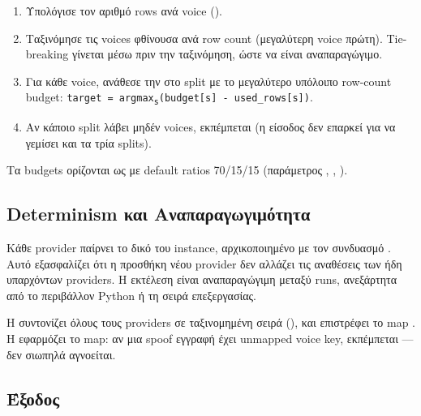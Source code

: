 \begin{english}
\begin{enumerate}
  \item Υπολόγισε τον αριθμό rows ανά voice
        ().
  \item Ταξινόμησε τις voices φθίνουσα ανά row count
        (μεγαλύτερη voice πρώτη).
        Tie-breaking γίνεται μέσω 
        πριν την ταξινόμηση, ώστε να είναι αναπαραγώγιμο.
  \item Για κάθε voice, ανάθεσε την στο split
        με το μεγαλύτερο υπόλοιπο row-count budget:
        \texttt{target = argmax\textsubscript{s}(budget[s] - used\_rows[s])}.
  \item Αν κάποιο split λάβει μηδέν voices,
        εκπέμπεται 
        (η είσοδος δεν επαρκεί για να γεμίσει και τα τρία splits).
\end{enumerate}
\end{english}

Τα budgets ορίζονται ως 
με default ratios 70/15/15 (παράμετρος ,
, ).

\subsection{Determinism και Αναπαραγωγιμότητα}
\label{subsec:determinism}

Κάθε provider παίρνει το δικό του  instance,
αρχικοποιημένο με τον συνδυασμό .
Αυτό εξασφαλίζει ότι η προσθήκη νέου provider
δεν αλλάζει τις αναθέσεις των ήδη υπαρχόντων providers.
Η εκτέλεση είναι αναπαραγώγιμη μεταξύ runs,
ανεξάρτητα από το περιβάλλον Python ή τη σειρά επεξεργασίας.

Η  συντονίζει όλους τους providers
σε ταξινομημένη σειρά (),
και επιστρέφει το map .
Η  εφαρμόζει το map:
αν μια spoof εγγραφή έχει unmapped voice key,
εκπέμπεται  — δεν σιωπηλά αγνοείται.

\subsection{Έξοδος}
\label{subsec:output-manifest}

